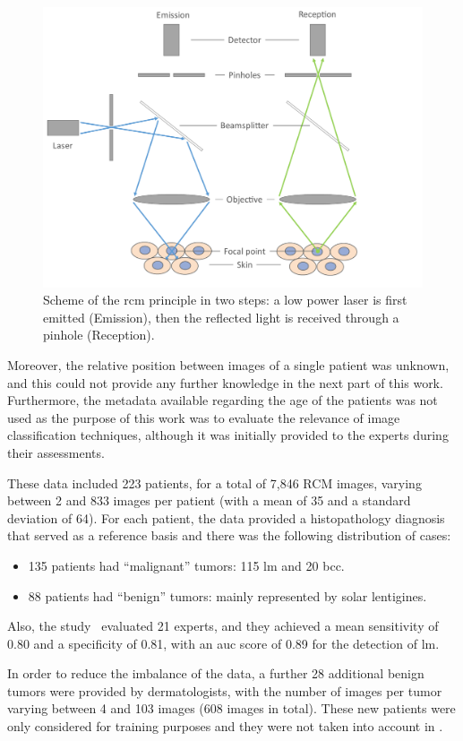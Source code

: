 \documentclass[journal,article,submit,moreauthors,pdftex, applsci]{Definitions/mdpi}
\begin{document}
\begin{figure}[h]
    \begin{center}
        \includegraphics[width=0.7\linewidth]{Figures/RCM.pdf}
        \caption{Scheme of the \ac{rcm} principle in two steps: a low power laser is first emitted (Emission), then the reflected light is received through a pinhole (Reception).}
        \label{fig:rcm}
    \end{center} 
\end{figure}\par
Moreover, the relative position between images of a single patient was unknown, and this could not provide any further knowledge in the next part of this work. Furthermore, the metadata available regarding the age of the patients was not used as the purpose of this work was to evaluate the relevance of image classification techniques, although it was initially provided to the experts during their assessments.\par
These data included 223 patients, for a total of 7,846 RCM images, varying between 2 and 833 images per patient (with a mean of 35 and a standard deviation of 64). For each patient, the data provided a histopathology diagnosis that served as a reference basis and there was the following distribution of cases:
\begin{itemize}  
\item 135 patients had “malignant” tumors: 115 \ac{lm} and 20 \ac{bcc}.
\item 88 patients had “benign” tumors: mainly represented by solar lentigines.
\end{itemize}\par
Also, the study~\cite{Cinotti2018} evaluated 21 experts, and they achieved a mean sensitivity of 0.80 and a specificity of 0.81, with an \ac{auc} score of 0.89 for the detection of \ac{lm}.\par
In order to reduce the imbalance of the data, a further 28 additional benign tumors were provided by dermatologists, with the number of images per tumor varying between 4 and 103 images (608 images in total). These new patients were only considered for training purposes and they were not taken into account in .\par
\end{document}
